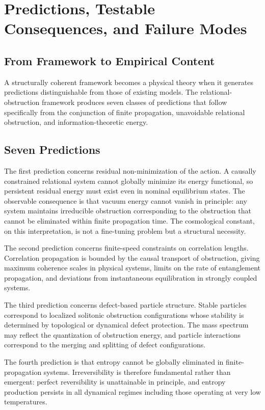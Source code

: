 \documentclass[12pt,a4paper,openany]{book}
\theoremstyle{plain}
\theoremstyle{definition}
\theoremstyle{remark}
\begin{document}
\section{Predictions, Testable Consequences, and Failure Modes}
\label{sec:predictions_failure_modes}

\subsection{From Framework to Empirical Content}

A structurally coherent framework becomes a physical theory when it generates predictions distinguishable from those of existing models. The relational-obstruction framework produces seven classes of predictions that follow specifically from the conjunction of finite propagation, unavoidable relational obstruction, and information-theoretic energy.

\subsection{Seven Predictions}

The first prediction concerns residual non-minimization of the action. A causally constrained relational system cannot globally minimize its energy functional, so persistent residual energy must exist even in nominal equilibrium states. The observable consequence is that vacuum energy cannot vanish in principle: any system maintains irreducible obstruction corresponding to the obstruction that cannot be eliminated within finite propagation time. The cosmological constant, on this interpretation, is not a fine-tuning problem but a structural necessity.

The second prediction concerns finite-speed constraints on correlation lengths. Correlation propagation is bounded by the causal transport of obstruction, giving maximum coherence scales in physical systems, limits on the rate of entanglement propagation, and deviations from instantaneous equilibration in strongly coupled systems.

The third prediction concerns defect-based particle structure. Stable particles correspond to localized solitonic obstruction configurations whose stability is determined by topological or dynamical defect protection. The mass spectrum may reflect the quantization of obstruction energy, and particle interactions correspond to the merging and splitting of defect configurations.

The fourth prediction is that entropy cannot be globally eliminated in finite-propagation systems. Irreversibility is therefore fundamental rather than emergent: perfect reversibility is unattainable in principle, and entropy production persists in all dynamical regimes including those operating at very low temperatures.
\end{document}
